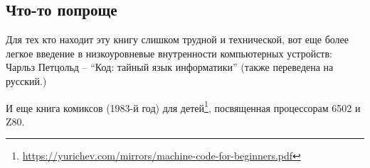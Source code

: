 

\subsection{Что-то попроще}

Для тех кто находит эту книгу слишком трудной и технической,
вот еще более легкое введение в низкоуровневые внутренности компьютерных устройств:
Чарльз Петцольд -- ``Код: тайный язык информатики'' (также переведена на русский.)

И еще книга комиксов (1983-й год) для детей\footnote{\url{https://yurichev.com/mirrors/machine-code-for-beginners.pdf}},
посвященная процессорам 6502 и Z80.

